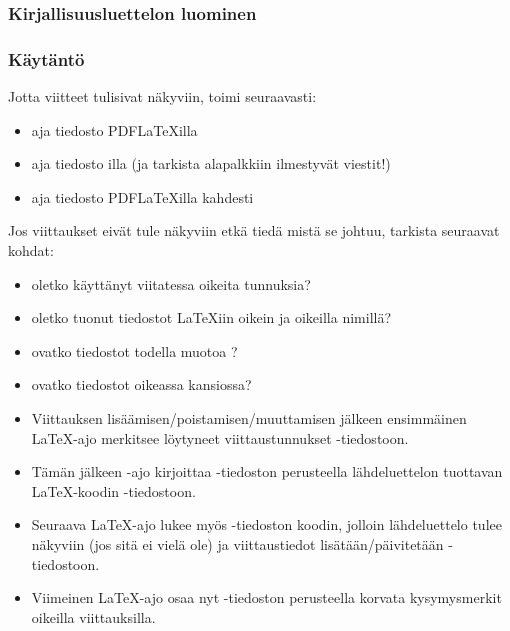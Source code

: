 \begin{frame}[fragile]
    \frametitle{Kirjallisuusluettelon luominen}
    
    
\end{frame}
\begin{frame}[fragile]
    \frametitle{Käytäntö}
    Jotta viitteet tulisivat näkyviin, toimi seuraavasti:
    \begin{itemize}
        \item aja tiedosto PDFLaTeXilla
        \item aja tiedosto \BibTeX{}illa (ja tarkista alapalkkiin ilmestyvät viestit!)
        \item aja tiedosto PDFLaTeXilla kahdesti
    \end{itemize} 
    Jos viittaukset eivät tule näkyviin etkä tiedä mistä se johtuu, tarkista seuraavat kohdat:
    \begin{itemize}
        \item oletko käyttänyt viitatessa oikeita tunnuksia?
        \item oletko tuonut tiedostot \LaTeX iin oikein ja oikeilla nimillä?
        \item ovatko tiedostot todella muotoa ?
        \item ovatko tiedostot oikeassa kansiossa?
    \end{itemize}
\end{frame}

\begin{frame}[fragile]
    \begin{extra}
        \begin{itemize}
            \item Viittauksen lisäämisen/poistamisen/muuttamisen jälkeen ensimmäinen \LaTeX-ajo merkitsee löytyneet viittaustunnukset -tiedostoon.
            \item Tämän jälkeen \BibTeX-ajo kirjoittaa -tiedoston perusteella lähdeluettelon tuottavan \LaTeX-koodin -tiedostoon.
            \item Seuraava \LaTeX-ajo lukee myös -tiedoston koodin, jolloin lähdeluettelo tulee näkyviin (jos sitä ei vielä ole) ja viittaustiedot lisätään/päivitetään -tiedostoon.
            \item Viimeinen \LaTeX-ajo osaa nyt -tiedoston perusteella korvata kysymysmerkit oikeilla viittauksilla.
        \end{itemize}
    \end{extra}
\end{frame}
%
